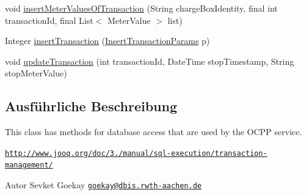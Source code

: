 \begin{DoxyCompactItemize}
\item 
void \hyperlink{classde_1_1rwth_1_1idsg_1_1steve_1_1repository_1_1impl_1_1_ocpp_server_repository_impl_a1f019ba19371134836f429d50f8e3531}{insert\-Meter\-Values\-Of\-Transaction} (String charge\-Box\-Identity, final int transaction\-Id, final List$<$ Meter\-Value $>$ list)
\item 
Integer \hyperlink{classde_1_1rwth_1_1idsg_1_1steve_1_1repository_1_1impl_1_1_ocpp_server_repository_impl_aee738d89085b14d44096000d52625f83}{insert\-Transaction} (\hyperlink{classde_1_1rwth_1_1idsg_1_1steve_1_1repository_1_1dto_1_1_insert_transaction_params}{Insert\-Transaction\-Params} p)
\item 
void \hyperlink{classde_1_1rwth_1_1idsg_1_1steve_1_1repository_1_1impl_1_1_ocpp_server_repository_impl_a09d464e362b67cc329474a42fe7339e4}{update\-Transaction} (int transaction\-Id, Date\-Time stop\-Timestamp, String stop\-Meter\-Value)
\end{DoxyCompactItemize}


\subsection{Ausführliche Beschreibung}
This class has methods for database access that are used by the O\-C\-P\-P service.

\href{http://www.jooq.org/doc/3.4/manual/sql-execution/transaction-management/}{\tt http\-://www.\-jooq.\-org/doc/3./manual/sql-\/execution/transaction-\/management/}

\begin{DoxyAuthor}{Autor}
Sevket Goekay \href{mailto:goekay@dbis.rwth-aachen.de}{\tt goekay@dbis.\-rwth-\/aachen.\-de} 
\end{DoxyAuthor}


